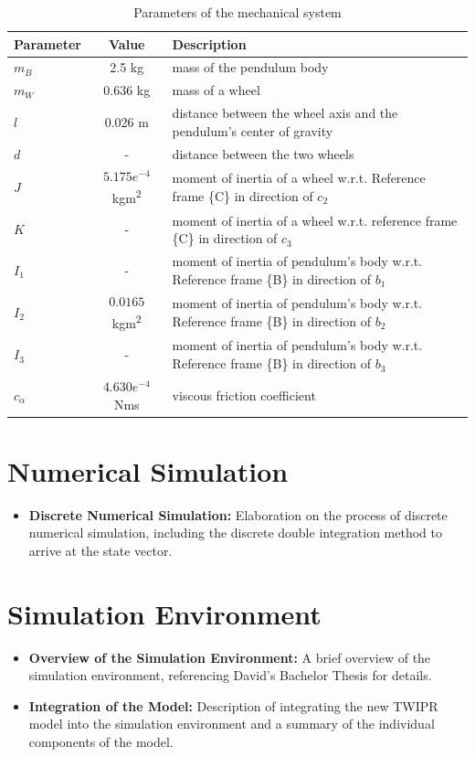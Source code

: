 	\begin{table}[h!]
		\centering
		\caption{Parameters of the mechanical system}
		\label{tab:parameters}
		\begin{tabular}{lcl}
			\toprule
			Parameter & Value & Description \\
			\midrule
			$m_B$ & 2.5 kg & mass of the pendulum body \\
			$m_W$ & 0.636 kg & mass of a wheel \\
			$l$ & 0.026 m & distance between the wheel axis and the pendulum's center of gravity \\
			$d$ & - & distance between the two wheels \\
			$J$ & \(5.175 e^{-4}\) kgm\textsuperscript{2} & moment of inertia of a wheel w.r.t. Reference frame \{C\} in direction of \(c_2\) \\
			$K$ & - & moment of inertia of a wheel w.r.t. reference frame \{C\} in direction of \(c_3\) \\
			$I_1$ & - & moment of inertia of pendulum's body w.r.t. Reference frame \{B\} in direction of \(b_1\) \\
			$I_2$ & \(0.0165\) kgm\textsuperscript{2} & moment of inertia of pendulum's body w.r.t. Reference frame \{B\} in direction of \(b_2\) \\
			$I_3$ & - & moment of inertia of pendulum's body w.r.t. Reference frame \{B\} in direction of \(b_3\) \\
			$c_\alpha$ & \(4.630 e^{-4}\) Nms & viscous friction coefficient \\
			\bottomrule
		\end{tabular}
	\end{table}
	
	
	



\section{Numerical Simulation}
\begin{itemize}
	\item \textbf{Discrete Numerical Simulation:} Elaboration on the process of discrete numerical simulation, including the discrete double integration method to arrive at the state vector.
\end{itemize}

\section{Simulation Environment}
\begin{itemize}
	\item \textbf{Overview of the Simulation Environment:} A brief overview of the simulation environment, referencing David's Bachelor Thesis for details.
	
	
	\item \textbf{Integration of the Model:} Description of integrating the new TWIPR model into the simulation environment and a summary of the individual components of the model.
\end{itemize}

